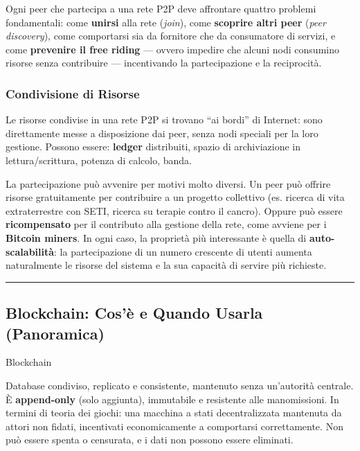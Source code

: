 \documentclass[
  italian,
  openany]{book}
\begin{document}
Ogni peer che partecipa a una rete P2P deve affrontare quattro problemi
fondamentali: come \textbf{unirsi} alla rete (\emph{join}), come
\textbf{scoprire altri peer} (\emph{peer discovery}), come comportarsi
sia da fornitore che da consumatore di servizi, e come \textbf{prevenire
il free riding} --- ovvero impedire che alcuni nodi consumino risorse
senza contribuire --- incentivando la partecipazione e la reciprocità.

\subsubsection{Condivisione di Risorse}\label{condivisione-di-risorse}

Le risorse condivise in una rete P2P si trovano ``ai bordi'' di
Internet: sono direttamente messe a disposizione dai peer, senza nodi
speciali per la loro gestione. Possono essere: \textbf{ledger}
distribuiti, spazio di archiviazione in lettura/scrittura, potenza di
calcolo, banda.

La partecipazione può avvenire per motivi molto diversi. Un peer può
offrire risorse gratuitamente per contribuire a un progetto collettivo
(es. ricerca di vita extraterrestre con SETI, ricerca su terapie contro
il cancro). Oppure può essere \textbf{ricompensato} per il contributo
alla gestione della rete, come avviene per i \textbf{Bitcoin miners}. In
ogni caso, la proprietà più interessante è quella di
\textbf{auto-scalabilità}: la partecipazione di un numero crescente di
utenti aumenta naturalmente le risorse del sistema e la sua capacità di
servire più richieste.

\begin{center}\rule{0.5\linewidth}{0.5pt}\end{center}

\subsection{Blockchain: Cos'è e Quando Usarla
(Panoramica)}\label{blockchain-cosuxe8-e-quando-usarla-panoramica}

\begin{calloutdefinition}{Blockchain}

Database condiviso, replicato e consistente, mantenuto senza un'autorità
centrale. È \textbf{append-only} (solo aggiunta), immutabile e
resistente alle manomissioni. In termini di teoria dei giochi: una
macchina a stati decentralizzata mantenuta da attori non fidati,
incentivati economicamente a comportarsi correttamente. Non può essere
spenta o censurata, e i dati non possono essere eliminati.

\end{calloutdefinition}
\end{document}

